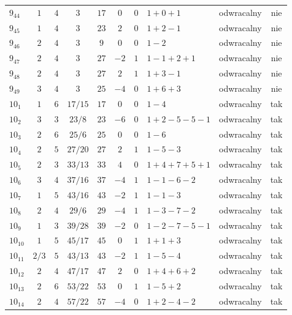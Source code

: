 \begin{longtable}{lccccccllc}
$9_{44}$   & $1$   & $4$ & $3$ & $17$  & $0$  & $0$ & $1+0+1$       & odwracalny & nie \\
$9_{45}$   & $1$   & $4$ & $3$ & $23$  & $2$  & $0$ & $1+2-1$       & odwracalny & nie \\
$9_{46}$   & $2$   & $4$ & $3$ & $9$   & $0$  & $0$ & $1-2$         & odwracalny & nie \\
$9_{47}$   & $2$   & $4$ & $3$ & $27$  & $-2$ & $1$ & $1-1+2+1$     & odwracalny & nie \\
$9_{48}$   & $2$   & $4$ & $3$ & $27$  & $2$  & $1$ & $1+3-1$       & odwracalny & nie \\
$9_{49}$   & $3$   & $4$ & $3$ & $25$  & $-4$ & $0$ & $1+6+3$       & odwracalny & nie \\
$10_{1}$   & $1$   & $6$ & $17/15$ & $17$  & $0$  & $0$ & $1-4$         & odwracalny & tak \\
$10_{2}$   & $3$   & $3$ & $23/8$ & $23$  & $-6$ & $0$ & $1+2-5-5-1$   & odwracalny & tak \\
$10_{3}$   & $2$   & $6$ & $25/6$ & $25$  & $0$  & $0$ & $1-6$         & odwracalny & tak \\
$10_{4}$   & $2$   & $5$ & $27/20$ & $27$  & $2$  & $1$ & $1-5-3$       & odwracalny & tak \\
$10_{5}$   & $2$   & $3$ & $33/13$ & $33$  & $4$  & $0$ & $1+4+7+5+1$   & odwracalny & tak \\
$10_{6}$   & $3$   & $4$ & $37/16$ & $37$  & $-4$ & $1$ & $1-1-6-2$     & odwracalny & tak \\
$10_{7}$   & $1$   & $5$ & $43/16$ & $43$  & $-2$ & $1$ & $1-1-3$       & odwracalny & tak \\
$10_{8}$   & $2$   & $4$ & $29/6$ & $29$  & $-4$ & $1$ & $1-3-7-2$     & odwracalny & tak \\
$10_{9}$   & $1$   & $3$ & $39/28$ & $39$  & $-2$ & $0$ & $1-2-7-5-1$   & odwracalny & tak \\
$10_{10}$  & $1$   & $5$ & $45/17$ & $45$  & $0$  & $1$ & $1+1+3$       & odwracalny & tak \\
$10_{11}$  & $2/3$ & $5$ & $43/13$ & $43$  & $-2$ & $1$ & $1-5-4$       & odwracalny & tak \\
$10_{12}$  & $2$   & $4$ & $47/17$ & $47$  & $2$  & $0$ & $1+4+6+2$     & odwracalny & tak \\
$10_{13}$  & $2$   & $6$ & $53/22$ & $53$  & $0$  & $1$ & $1-5+2$       & odwracalny & tak \\
$10_{14}$  & $2$   & $4$ & $57/22$ & $57$  & $-4$ & $0$ & $1+2-4-2$     & odwracalny & tak \\

\end{longtable}
